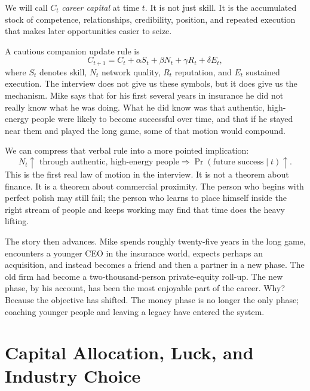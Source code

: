 \begin{definition}
We will call \(C_t\) \emph{career capital} at time \(t\). It is not just skill. It is the accumulated stock of competence, relationships, credibility, position, and repeated execution that makes later opportunities easier to seize.
\end{definition}

A cautious companion update rule is
\begin{equation}
C_{t+1}=C_t+\alpha S_t+\beta N_t+\gamma R_t+\delta E_t,
\end{equation}
where \(S_t\) denotes skill, \(N_t\) network quality, \(R_t\) reputation, and \(E_t\) sustained execution. The interview does not give us these symbols, but it does give us the mechanism. Mike says that for his first several years in insurance he did not really know what he was doing. What he did know was that authentic, high-energy people were likely to become successful over time, and that if he stayed near them and played the long game, some of that motion would compound.

We can compress that verbal rule into a more pointed implication:
\begin{equation}
N_t \uparrow \text{ through authentic, high-energy people}
\Longrightarrow
\Pr(\text{future success}\mid t)\uparrow.
\end{equation}
This is the first real law of motion in the interview. It is not a theorem about finance. It is a theorem about commercial proximity. The person who begins with perfect polish may still fail; the person who learns to place himself inside the right stream of people and keeps working may find that time does the heavy lifting.

The story then advances. Mike spends roughly twenty-five years in the long game, encounters a younger CEO in the insurance world, expects perhaps an acquisition, and instead becomes a friend and then a partner in a new phase. The old firm had become a two-thousand-person private-equity roll-up. The new phase, by his account, has been the most enjoyable part of the career. Why? Because the objective has shifted. The money phase is no longer the only phase; coaching younger people and leaving a legacy have entered the system.

\section{Capital Allocation, Luck, and Industry Choice}

